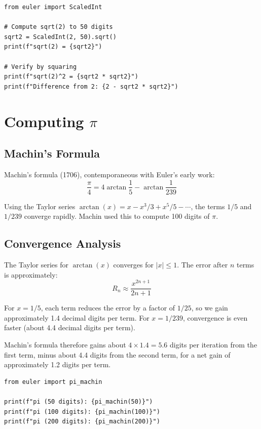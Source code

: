 \begin{lstlisting}[caption={High-precision square root}, label=lst:hp_sqrt]
from euler import ScaledInt

# Compute sqrt(2) to 50 digits
sqrt2 = ScaledInt(2, 50).sqrt()
print(f"sqrt(2) = {sqrt2}")

# Verify by squaring
print(f"sqrt(2)^2 = {sqrt2 * sqrt2}")
print(f"Difference from 2: {2 - sqrt2 * sqrt2}")
\end{lstlisting}

\section{Computing $\pi$}

\subsection{Machin's Formula}

Machin's formula (1706), contemporaneous with Euler's early work:
\[
\frac{\pi}{4} = 4 \arctan\frac{1}{5} - \arctan\frac{1}{239}
\]

Using the Taylor series $\arctan(x) = x - x^3/3 + x^5/5 - \cdots$, the terms
$1/5$ and $1/239$ converge rapidly. Machin used this to compute 100 digits of $\pi$.

\subsection{Convergence Analysis}

The Taylor series for $\arctan(x)$ converges for $|x| \leq 1$. The error after $n$ terms is approximately:
\[
R_n \approx \frac{x^{2n+1}}{2n+1}
\]

For $x = 1/5$, each term reduces the error by a factor of $1/25$, so we gain approximately 1.4 decimal digits per term.
For $x = 1/239$, convergence is even faster (about 4.4 decimal digits per term).

Machin's formula therefore gains about $4 \times 1.4 = 5.6$ digits per iteration from the first term,
minus about 4.4 digits from the second term, for a net gain of approximately 1.2 digits per term.

\begin{lstlisting}[caption={Pi via Machin's formula}, label=lst:pi_machin]
from euler import pi_machin

print(f"pi (50 digits): {pi_machin(50)}")
print(f"pi (100 digits): {pi_machin(100)}")
print(f"pi (200 digits): {pi_machin(200)}")
\end{lstlisting}

